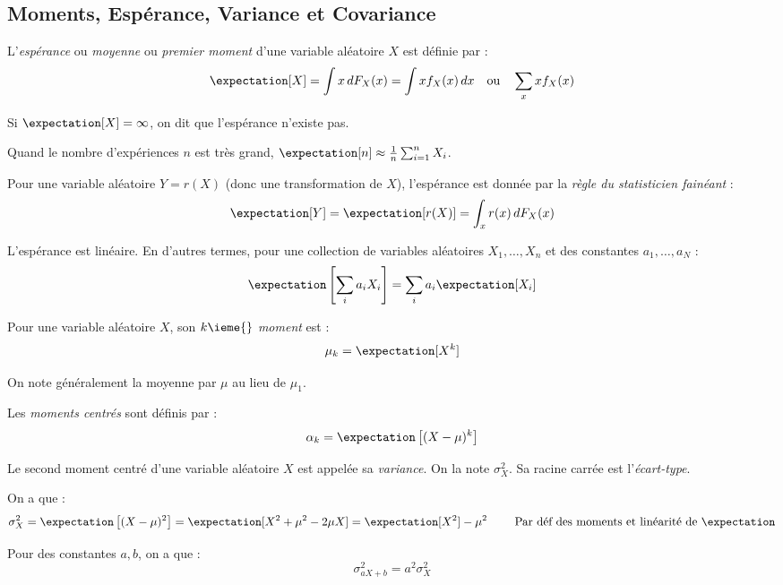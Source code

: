 \subsection{Moments, Espérance, Variance et Covariance}
    \begin{definition}
        L'\textit{espérance} ou \textit{moyenne} ou \textit{premier moment} d'une variable aléatoire \(X\) est définie par :
        \[
            \expectation[X] = \int x\,dF_X(x) = \int xf_X(x)\,dx \text{\hspace{1em}ou\hspace{1em}}  \sum_x xf_X(x)
        \]

        Si \(\expectation[X] = \infty\), on dit que l'espérance n'existe pas. %

        Quand le nombre d'expériences \(n\) est très grand, \(\expectation[n] \approx \frac{1}{n} \sum_{i=1}^n X_i\).
    \end{definition}

    Pour une variable aléatoire \(Y = r(X)\) (donc une transformation de \(X\)), l'espérance est donnée par la \textit{règle du statisticien fainéant} :
    \[
        \expectation[Y] = \expectation[r(X)] = \int_x r(x)\,dF_X(x)
    \]

    \begin{theorem}
        L'espérance est linéaire. En d'autres termes, pour une collection de variables aléatoires \(X_1, \dots, X_n\) et des constantes \(a_1, \dots, a_N\) :
        \[
            \expectation\left[\sum_i a_iX_i\right] = \sum_i a_i \expectation[X_i]
        \]
    \end{theorem}

    \begin{definition}
        Pour une variable aléatoire \(X\), son \textit{\(k\ieme{}\) moment} est :
        \[
            \mu_k = \expectation[X^k]
        \]

        On note généralement la moyenne par \(\mu\) au lieu de \(\mu_1\).

        Les \textit{moments centrés} sont définis par :
        \[
            \alpha_k = \expectation\left[(X - \mu)^k\right]    
        \]
    \end{definition}

    \begin{definition}
        Le second moment centré d'une variable aléatoire \(X\) est appelée sa \textit{variance}. On la note \(\sigma_X^2\). Sa racine carrée est l'\textit{écart-type}.

        On a que :
        \[
            \sigma^2_X = \expectation\left[(X - \mu)^2\right] = \expectation[X^2 + \mu^2 - 2\mu X] = \expectation[X^2] - \mu^2 \text{\hspace{2em} Par déf des moments et linéarité de \(\expectation\)}
        \]

        Pour des constantes \(a, b\), on a que :
        \[
            \sigma_{aX+b}^2 = a^2\sigma_X^2
        \]
    \end{definition}

